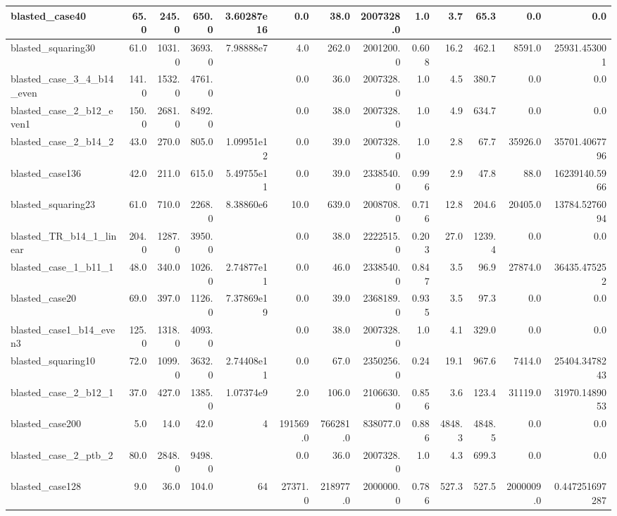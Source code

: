 \begin{tabular}{|l r r r r| r r r r r r | r r|}
blasted\_case40 & 65.0 & 245.0 & 650.0 & 3.60287e16 & 0.0 & 38.0 & 2007328.0 & 1.0 & 3.7 & 65.3 & 0.0 & 0.0 \\
\hline
blasted\_squaring30 & 61.0 & 1031.0 & 3693.0 & 7.98888e7 & 4.0 & 262.0 & 2001200.0 & 0.608 & 16.2 & 462.1 & 8591.0 & 25931.453001 \\
\hline
blasted\_case\_3\_4\_b14\_even & 141.0 & 1532.0 & 4761.0 &  & 0.0 & 36.0 & 2007328.0 & 1.0 & 4.5 & 380.7 & 0.0 & 0.0 \\
\hline
blasted\_case\_2\_b12\_even1 & 150.0 & 2681.0 & 8492.0 &  & 0.0 & 38.0 & 2007328.0 & 1.0 & 4.9 & 634.7 & 0.0 & 0.0 \\
\hline
blasted\_case\_2\_b14\_2 & 43.0 & 270.0 & 805.0 & 1.09951e12 & 0.0 & 39.0 & 2007328.0 & 1.0 & 2.8 & 67.7 & 35926.0 & 35701.4067796 \\
\hline
blasted\_case136 & 42.0 & 211.0 & 615.0 & 5.49755e11 & 0.0 & 39.0 & 2338540.0 & 0.996 & 2.9 & 47.8 & 88.0 & 16239140.5966 \\
\hline
blasted\_squaring23 & 61.0 & 710.0 & 2268.0 & 8.38860e6 & 10.0 & 639.0 & 2008708.0 & 0.716 & 12.8 & 204.6 & 20405.0 & 13784.5276094 \\
\hline
blasted\_TR\_b14\_1\_linear & 204.0 & 1287.0 & 3950.0 &  & 0.0 & 38.0 & 2222515.0 & 0.203 & 27.0 & 1239.4 & 0.0 & 0.0 \\
\hline
blasted\_case\_1\_b11\_1 & 48.0 & 340.0 & 1026.0 & 2.74877e11 & 0.0 & 46.0 & 2338540.0 & 0.847 & 3.5 & 96.9 & 27874.0 & 36435.475252 \\
\hline
blasted\_case20 & 69.0 & 397.0 & 1126.0 & 7.37869e19 & 0.0 & 39.0 & 2368189.0 & 0.935 & 3.5 & 97.3 & 0.0 & 0.0 \\
\hline
blasted\_case1\_b14\_even3 & 125.0 & 1318.0 & 4093.0 &  & 0.0 & 38.0 & 2007328.0 & 1.0 & 4.1 & 329.0 & 0.0 & 0.0 \\
\hline
blasted\_squaring10 & 72.0 & 1099.0 & 3632.0 & 2.74408e11 & 0.0 & 67.0 & 2350256.0 & 0.24 & 19.1 & 967.6 & 7414.0 & 25404.3478243 \\
\hline
blasted\_case\_2\_b12\_1 & 37.0 & 427.0 & 1385.0 & 1.07374e9 & 2.0 & 106.0 & 2106630.0 & 0.856 & 3.6 & 123.4 & 31119.0 & 31970.1489053 \\
\hline
blasted\_case200 & 5.0 & 14.0 & 42.0 & 4 & 191569.0 & 766281.0 & 838077.0 & 0.886 & 4848.3 & 4848.5 & 0.0 & 0.0 \\
\hline
blasted\_case\_2\_ptb\_2 & 80.0 & 2848.0 & 9498.0 &  & 0.0 & 36.0 & 2007328.0 & 1.0 & 4.3 & 699.3 & 0.0 & 0.0 \\
\hline
blasted\_case128 & 9.0 & 36.0 & 104.0 & 64 & 27371.0 & 218977.0 & 2000000.0 & 0.786 & 527.3 & 527.5 & 2000009.0 & 0.447251697287 \\

\end{tabular}
